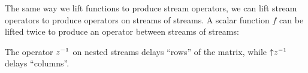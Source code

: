 The same way we lift functions to produce stream operators, we can
lift stream operators to produce operators on streams of streams.
A scalar function $f$ can be lifted twice to produce an operator
between streams of streams:
%
\begin{center}
\end{center}
\vspace{-2ex}


The operator $z^{-1}$ on nested streams delays ``rows'' of the matrix,
while ${\uparrow}z^{-1}$ delays ``columns''.

